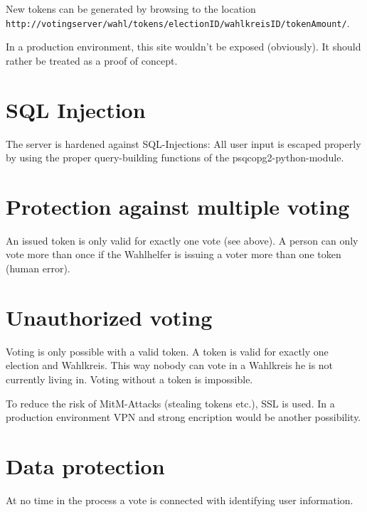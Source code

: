 \documentclass[10pt,a4paper]{article}
\begin{document}
New tokens can be generated by browsing to the location \\
\texttt{http://votingserver/wahl/tokens/electionID/wahlkreisID/tokenAmount/}.

In a production environment, this site wouldn't be exposed (obviously). It should rather be treated as a proof of concept.
\section*{SQL Injection}
The server is hardened against SQL-Injections: All user input is escaped properly by using the proper query-building functions of the psqcopg2-python-module.



\section*{Protection against multiple voting}
An issued token is only valid for exactly one vote (see above). A person can only vote more than once if the Wahlhelfer is issuing a voter more than one token (human error).

\section*{Unauthorized voting}
Voting is only possible with a valid token. A token is valid for exactly one election and Wahlkreis. This way nobody can vote in a Wahlkreis he is not currently living in. Voting without a token is impossible. 

To reduce the risk of MitM-Attacks (stealing tokens etc.), SSL is used. In a production environment VPN and strong encription would be another possibility.

\section*{Data protection}
At no time in the process a vote is connected with identifying user information. 
\end{document}
